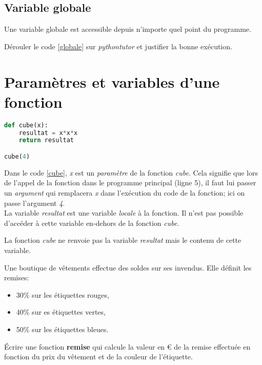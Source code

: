 \documentclass[a4paper,11pt]{article}
\begin{document}
\begin{Form}
\subsection{Variable globale}
\begin{aretenir}[]
Une variable globale est accessible depuis n'importe quel point du programme.
\end{aretenir}
\begin{activite}
Dérouler le code \ref{globale} sur \emph{pythontutor} et justifier la bonne exécution.
\end{activite}
\section{Paramètres et variables d'une fonction}
\begin{center}
\begin{lstlisting}[language=Python]
def cube(x):
	resultat = x*x*x
	return resultat

cube(4)
\end{lstlisting}
\label{cube}
\end{center}
Dans le code \ref{cube}, \emph{x} est un \emph{paramètre} de la fonction \emph{cube}. Cela signifie que lors de l'appel de la fonction dans le programme principal (ligne 5), il faut lui passer un \emph{argument} qui remplacera \emph{x} dans l'exécution du code de la fonction; ici on passe l'argument \emph{4}.\\
La variable \emph{resultat} est une variable \emph{locale} à la fonction. Il n'est pas possible d'accéder à cette variable en-dehors de la fonction \emph{cube}.
\begin{aretenir}[]
La fonction \emph{cube} ne renvoie pas la variable \emph{resultat} mais le contenu de cette variable. 
\end{aretenir}
\begin{activite}
Une boutique de vêtements effectue des soldes sur ses invendus. Elle définit les remises:
\begin{itemize}
\item 30\% sur les étiquettes rouges,
\item 40\% sur es étiquettes vertes,
\item 50\% sur les étiquettes bleues.
\end{itemize}
Écrire une fonction \textbf{remise} qui calcule la valeur en € de la remise effectuée en fonction du prix du vêtement et de la couleur de l'étiquette.
\end{activite}

\end{Form}
\end{document}
